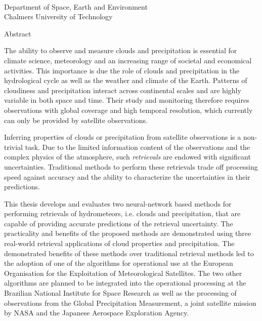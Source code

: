 \thispagestyle{plain}
  {\large \textbf{\thetitle}}
  
  \vspace{0.4cm}
  
  \vspace{0.4cm}
  {\sc \theauthor} \\
  Department of Space, Earth and Environment \\
  Chalmers University of Technology
  
  \vspace{0.5cm}
  {\sc Abstract}
  \vspace{0.5cm}

The ability to observe and measure clouds and precipitation is essential for
climate science, meteorology and an increasing range of societal and economical
activities. This importance is due the role of clouds and precipitation in the
hydrological cycle as well as the weather and climate of the Earth. Patterns of
cloudiness and precipitation interact across continental scales and are highly
variable in both space and time. Their study and monitoring therefore requires
observations with global coverage and high temporal resolution, which currently
can only be provided by satellite observations.

Inferring properties of clouds or precipitation from satellite observations is a
non-trivial task. Due to the limited information content of the observations and
the complex physics of the atmosphere, such \textit{retrievals} are endowed with
significant uncertainties. Traditional methods to perform these retrievals trade
off processing speed against accuracy and the ability to characterize the
uncertainties in their predictions.

This thesis develops and evaluates two neural-network based methods for
performing retrievals of hydrometeors, i.e. clouds and precipitation, that are
capable of providing accurate predictions of the retrieval uncertainty. The
practicality and benefits of the proposed methods are demonstrated using three
real-world retrieval applications of cloud properties and precipitation. The
demonstrated benefits of these methods over traditional retrieval methods
 led to the adoption of one of the algorithms for operational use at the
European Organisation for the Exploitation of Meteorological Satellites. The two
other algorithms are planned to be integrated into the operational processing at
the Brazilian National Institute for Space Research as well as the processing of
observations from the Global Precipitation Measurement, a joint satellite
mission by NASA and the Japanese Aerospace Exploration Agency.

